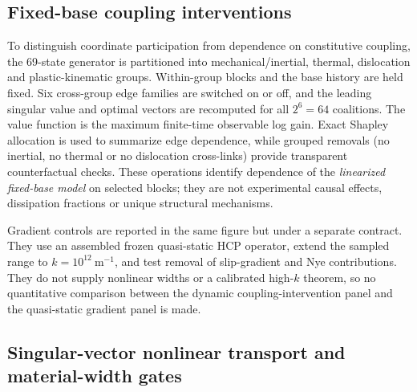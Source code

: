 \subsection{Fixed-base coupling interventions}

To distinguish coordinate participation from dependence on constitutive coupling, the 69-state generator is partitioned into mechanical/inertial, thermal, dislocation and plastic-kinematic groups. Within-group blocks and the base history are held fixed. Six cross-group edge families are switched on or off, and the leading singular value and optimal vectors are recomputed for all $2^6=64$ coalitions. The value function is the maximum finite-time observable log gain. Exact Shapley allocation is used to summarize edge dependence, while grouped removals (no inertial, no thermal or no dislocation cross-links) provide transparent counterfactual checks. These operations identify dependence of the \emph{linearized fixed-base model} on selected blocks; they are not experimental causal effects, dissipation fractions or unique structural mechanisms.

Gradient controls are reported in the same figure but under a separate contract. They use an assembled frozen quasi-static HCP operator, extend the sampled range to $k=10^{12}~\mathrm{m^{-1}}$, and test removal of slip-gradient and Nye contributions. They do not supply nonlinear widths or a calibrated high-$k$ theorem, so no quantitative comparison between the dynamic coupling-intervention panel and the quasi-static gradient panel is made.

\subsection{Singular-vector nonlinear transport and material-width gates}

